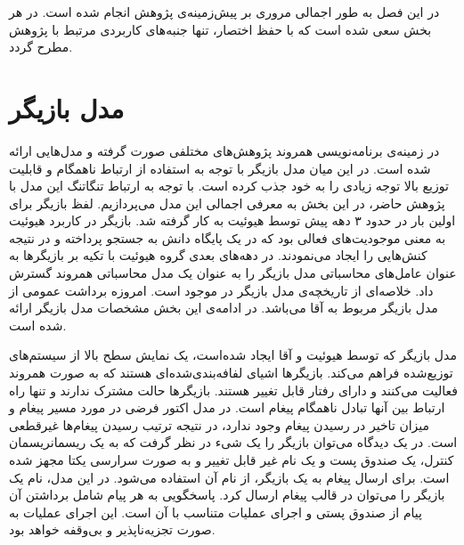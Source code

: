 در این فصل به طور اجمالی مروری بر پیش‌زمینه‌ی پژوهش انجام شده است. در هر بخش سعی شده است که با حفظ اختصار، تنها جنبه‌های  کاربردی مرتبط با پژوهش مطرح گردد.
\section{مدل بازیگر}

در زمینه‌ی برنامه‌نویسی همروند پژوهش‌های مختلفی صورت گرفته و مدل‌هایی ارائه شده است\cite{Briot98concurrencyand}. در این میان \gls{مدل بازیگر} با توجه به استفاده از ارتباط ناهمگام و قابلیت توزیع بالا توجه زیادی را به خود جذب کرده است. با توجه به ارتباط تنگاتنگ این مدل با پژوهش حاضر، در این بخش به معرفی اجمالی این مدل می‌پردازیم.
لفظ بازیگر برای اولین بار در حدود ۳ دهه پیش توسط هیوئیت  \cite{Hewitt1972} به کار گرفته شد. بازیگر در کاربرد هیوئیت به معنی موجودیت‌های فعالی بود که در یک پایگاه دانش به جستجو پرداخته و در نتیجه کنش‌هایی را ایجاد می‌نمودند. در دهه‌های بعدی گروه هیوئیت با تکیه بر بازیگرها به عنوان عامل‌های محاسباتی مدل بازیگر را به عنوان یک مدل محاسباتی همروند گسترش داد. خلاصه‌ای از تاریخچه‌ی مدل بازیگر در \cite{AghaMST97} موجود است. امروزه برداشت عمومی از مدل بازیگر مربوط به  آقا\cite{Agha_86} می‌باشد. در ادامه‌ی این بخش مشخصات مدل بازیگر ارائه شده است.
 
مدل بازیگر که توسط هیوئیت و آقا \cite{Hewitt1972,Agha1987,Agha1990} ایجاد شده‌است، یک نمایش سطح بالا از سیستم‌های توزیع‌شده فراهم می‌کند. 
\gls{بازیگر}ها
اشیای \gls{لفافه‌بندی‌شده}‌ای هستند که به صورت \gls{همروند} فعالیت می‌کنند و دارای \gls{رفتار} قابل تغییر هستند. 
بازیگرها \gls{حالت  مشترک} ندارند و تنها راه ارتباط بین آنها تبادل ناهمگام پیغام است. 
 در مدل اکتور فرضی در مورد مسیر پیغام و میزان تاخیر در رسیدن پیغام وجود ندارد، در نتیجه ترتیب رسیدن پیغام‌ها \gls{غیرقطعی} است.
 در یک دیدگاه می‌توان بازیگر را یک \gls{شی‌ء} در نظر گرفت که به یک ریسمان\gls{ریسمان} کنترل، یک صندوق پست و یک نام غیر قابل تغییر و به صورت سرارسی یکتا  مجهز شده است. برای ارسال پیغام به یک بازیگر، از نام آن استفاده می‌شود. در این مدل، نام  یک بازیگر را می‌توان در قالب پیغام  ارسال کرد. پاسخگویی به هر پیام شامل برداشتن آن پیام از صندوق پستی و اجرای عملیات متناسب با آن است.
این اجرای عملیات به صورت \gls{تجزیه‌ناپذیر} و بی‌وقفه خواهد بود\cite{Agha_86}.


